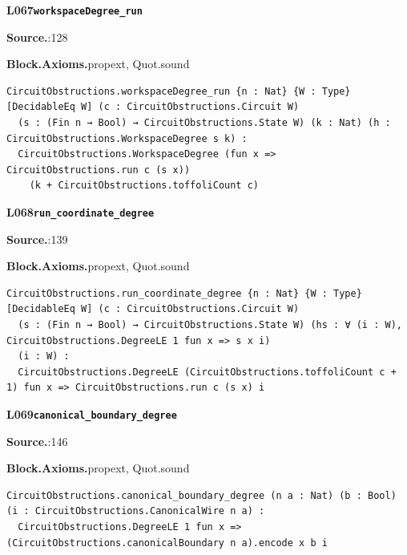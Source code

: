 \par\medskip\noindent\begin{minipage}{\textwidth}
{\small\bfseries L067\enspace\texttt{workspaceDegree\_run}\par}
{\footnotesize\raggedright\textbf{Source.}\enspace{}:128\par
\textbf{Block.}\quad\textbf{Axioms.}\enspace propext, Quot.sound\par}\nopagebreak
\begin{lstlisting}
CircuitObstructions.workspaceDegree_run {n : Nat} {W : Type} [DecidableEq W] (c : CircuitObstructions.Circuit W)
  (s : (Fin n → Bool) → CircuitObstructions.State W) (k : Nat) (h : CircuitObstructions.WorkspaceDegree s k) :
  CircuitObstructions.WorkspaceDegree (fun x => CircuitObstructions.run c (s x))
    (k + CircuitObstructions.toffoliCount c)
\end{lstlisting}
\end{minipage}\par

\par\medskip\noindent\begin{minipage}{\textwidth}
{\small\bfseries L068\enspace\texttt{run\_coordinate\_degree}\par}
{\footnotesize\raggedright\textbf{Source.}\enspace{}:139\par
\textbf{Block.}\quad\textbf{Axioms.}\enspace propext, Quot.sound\par}\nopagebreak
\begin{lstlisting}
CircuitObstructions.run_coordinate_degree {n : Nat} {W : Type} [DecidableEq W] (c : CircuitObstructions.Circuit W)
  (s : (Fin n → Bool) → CircuitObstructions.State W) (hs : ∀ (i : W), CircuitObstructions.DegreeLE 1 fun x => s x i)
  (i : W) :
  CircuitObstructions.DegreeLE (CircuitObstructions.toffoliCount c + 1) fun x => CircuitObstructions.run c (s x) i
\end{lstlisting}
\end{minipage}\par

\par\medskip\noindent\begin{minipage}{\textwidth}
{\small\bfseries L069\enspace\texttt{canonical\_boundary\_degree}\par}
{\footnotesize\raggedright\textbf{Source.}\enspace{}:146\par
\textbf{Block.}\quad\textbf{Axioms.}\enspace propext, Quot.sound\par}\nopagebreak
\begin{lstlisting}
CircuitObstructions.canonical_boundary_degree (n a : Nat) (b : Bool) (i : CircuitObstructions.CanonicalWire n a) :
  CircuitObstructions.DegreeLE 1 fun x => (CircuitObstructions.canonicalBoundary n a).encode x b i
\end{lstlisting}
\end{minipage}\par

